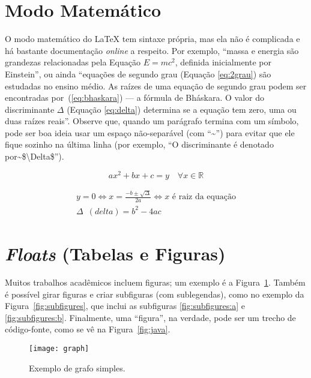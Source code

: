\section{Modo Matemático}

O modo matemático do \LaTeX{} tem sintaxe própria, mas ela não é complicada e
há bastante documentação \emph{online} a respeito. Por exemplo, ``massa e
energia são grandezas relacionadas pela Equação $E=mc^2$, definida inicialmente
por Einstein'', ou ainda ``equações de segundo grau (Equação \ref{eq:2grau})
são estudadas no ensino médio. As raízes de uma equação de segundo grau podem
ser encontradas por~(\ref{eq:bhaskara}) --- a fórmula de Bháskara.
O valor do discriminante $\Delta$ (Equação \ref{eq:delta}) determina se a
equação tem zero, uma ou duas raízes reais''. Observe que, quando um
parágrafo termina com um símbolo, pode ser boa ideia usar um espaço
não-separável (com ``\textsf{\textasciitilde}'') para evitar que ele
fique sozinho na última linha (por exemplo, ``\textsf{O discriminante é
denotado por\textasciitilde{}\$\textbackslash{}Delta\$}'').\label{orphanchar}

\begin{equation}
  \label{eq:2grau}
  ax^2+bx+c=y \quad \forall x \in \mathbb{R}
\end{equation}

\begin{gather}
\label{eq:bhaskara}
    y=0 \Leftrightarrow x=\frac{-b \pm \sqrt{\Delta}}{2a}
    \Leftrightarrow x \text{ é raiz da equação}\\
\label{eq:delta}
    \Delta\enspace(\mathit{delta}) = b^2-4ac
\end{gather}

\section{\emph{Floats} (Tabelas e Figuras)}

Muitos trabalhos acadêmicos incluem figuras; um exemplo é a
Figura~\ref{fig:humanbeta}. Também é possível girar figuras
e criar subfiguras (com sublegendas), como no exemplo da
Figura~\ref{fig:subfigures}, que inclui as
subfiguras \ref{fig:subfigures:a} e \ref{fig:subfigures:b}.
Finalmente, uma ``figura'', na verdade, pode ser um trecho de
código-fonte, como se vê na Figura~\ref{fig:java}.

\begin{figure}
  \centering
  \texttt{[image: graph]}
  \caption{Exemplo de grafo simples.}
  \label{fig:humanbeta}
\end{figure}

